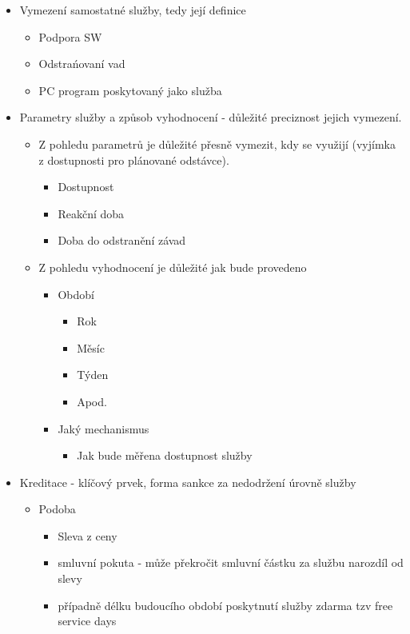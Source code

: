 \documentclass[12pt,a4paper,czech]{report}
\begin{document}
\begin{itemize}
    \item Vymezení samostatné služby, tedy její definice
    \begin{itemize}
        \item Podpora SW
        \item Odstrańovaní vad
        \item PC program poskytovaný jako služba
    \end{itemize}
    \item Parametry služby a způsob vyhodnocení - důležité preciznost jejich vymezení.
    \begin{itemize}
        \item Z pohledu parametrů je důležité přesně vymezit, kdy se využijí (vyjímka z dostupnosti pro plánované odstávce).
        \begin{itemize}
            \item Dostupnost
            \item Reakční doba
            \item Doba do odstranění závad
        \end{itemize}
        \item  Z pohledu vyhodnocení je důležité jak bude provedeno
        \begin{itemize}
            \item Období
            \begin{itemize}
                \item Rok
                \item Měsíc
                \item Týden
                \item Apod.
            \end{itemize}
            \item Jaký mechanismus
            \begin{itemize}
                \item Jak bude měřena dostupnost služby
            \end{itemize}
        \end{itemize}
    \end{itemize}
    \item Kreditace - klíčový prvek, forma sankce za nedodržení úrovně služby
    \begin{itemize}
        \item Podoba
        \begin{itemize}
            \item  Sleva z ceny
            \item smluvní pokuta - může překročit smluvní částku za službu narozdíl od slevy
            \item případně délku budoucího období poskytnutí služby zdarma tzv free service days
        \end{itemize}
    \end{itemize}
\end{itemize}
\end{document}
